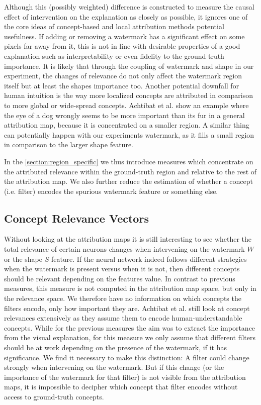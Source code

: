 Although this (possibly weighted) difference is constructed to measure the causal effect of intervention on the explanation as closely as possible, it ignores one of the core ideas of concept-based and local attribution methods potential usefulness. If adding or removing a watermark has a significant effect on some pixels far away from it, this is not in line with desirable properties of a good explanation such as interpretability or even fidelity to the ground truth importance. It is likely that through the coupling of watermark and shape in our experiment, the changes of relevance do not only affect the watermark region itself but at least the shapes importance too. 
Another potential downfall for human intuition is the way more localized concepts are attributed in comparison to more global or wide-spread concepts. Achtibat et al. \cite{Achtibat2022} show an example where the eye of a dog wrongly seems to be more important than its fur in a general attribution map, because it is concentrated on a smaller region. A similar thing can potentially happen with our experiments watermark, as it fills a small region in comparison to the larger shape feature. 

In the \cref{section:region_specific} we thus introduce measures which concentrate on the attributed relevance within the ground-truth region and relative to the rest of the attribution map.
We also further reduce the estimation of whether a concept (i.e. filter) encodes the spurious watermark feature or something else. 

\subsection{Concept Relevance Vectors}
Without looking at the attribution maps it is still interesting to see whether the total relevance of certain neurons changes when intervening on the watermark $W$ or the shape $S$ feature. If the neural network indeed follows different strategies when the watermark is present versus when it is not, then different concepts should be relevant depending on the features value. 
In contrast to previous measures, this measure is not computed in the attribution map space, but only in the relevance space. We therefore have no information on which concepts the filters encode, only how important they are. Achtibat et al. still look at concept relevances extensively as they assume them to encode human-understandable concepts. While for the previous measures the aim was to extract the importance from the visual explanation, for this measure we only assume that different filters should be at work depending on the presence of the watermark, if it has significance.
We find it necessary to make this distinction: A filter could change strongly when intervening on the watermark. But if this change (or the importance of the watermark for that filter) is not visible from the attribution maps, it is impossible to decipher which concept that filter encodes without access to ground-truth concepts. 

